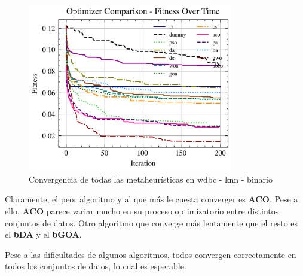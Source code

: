 \begin{figure}[htp]
    \includegraphics[width=0.8\textwidth]{imagenes/fitness_charts/img/binary/wdbc/optimizers_fitness_knn.png}
    \caption{Convergencia de todas las metaheurísticas en wdbc - knn - binario}
\end{figure}

Claramente, el peor algoritmo y al que más le cuesta converger es \textbf{ACO}. Pese a ello, \textbf{ACO} parece variar mucho en su proceso optimizatorio entre distintos conjuntos de datos. Otro algoritmo que converge más lentamente que el resto es el \textbf{bDA} y el \textbf{bGOA}.

Pese a las dificultades de algunos algoritmos, todos convergen correctamente en todos los conjuntos de datos, lo cual es esperable.

